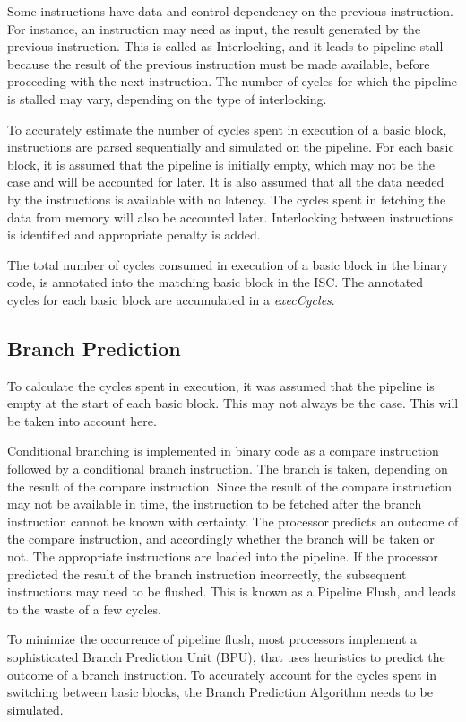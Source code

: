 Some instructions have data and control dependency on the previous instruction. For instance, an instruction may need as input, the result generated by the previous instruction. This is called as Interlocking, and it leads to pipeline stall because the result of the previous instruction must be made available, before proceeding with the next instruction. The number of cycles for which the pipeline is stalled may vary, depending on the type of interlocking.

To accurately estimate the number of cycles spent in execution of a basic block, instructions are parsed sequentially and simulated on the pipeline. For each basic block, it is assumed that the pipeline is initially empty, which may not be the case and will be accounted for later. It is also assumed that all the data needed by the instructions is available with no latency. The cycles spent in fetching the data from memory will also be accounted later. Interlocking between instructions is identified and appropriate penalty is added. 

The total number of cycles consumed in execution of a basic block in the binary code, is annotated into the matching basic block in the ISC. The annotated cycles for each basic block are accumulated in a \emph{execCycles}. 

\subsection{Branch Prediction}
To calculate the cycles spent in execution, it was assumed that the pipeline is empty at the start of each basic block. This may not always be the case. This will be taken into account here.

Conditional branching is implemented in binary code as a compare instruction followed by a conditional branch instruction. The branch is taken, depending on the result of the compare instruction. Since the result of the compare instruction may not be available in time, the instruction to be fetched after the branch instruction cannot be known with certainty. The processor predicts an outcome of the compare instruction, and accordingly whether the branch will be taken or not. The appropriate instructions are loaded into the pipeline. If the processor predicted the result of the branch instruction incorrectly, the subsequent instructions may need to be flushed. This is known as a Pipeline Flush, and leads to the waste of a few cycles.

To minimize the occurrence of pipeline flush, most processors implement a sophisticated Branch Prediction Unit (BPU), that uses heuristics to predict the outcome of a branch instruction. To accurately account for the cycles spent in switching between basic blocks, the Branch Prediction Algorithm needs to be simulated.

